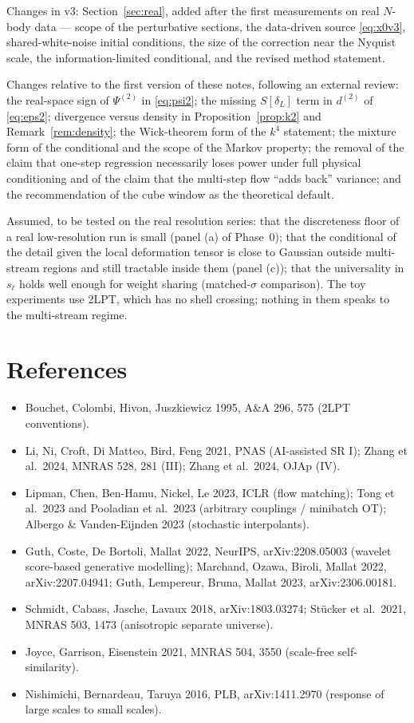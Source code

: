 \documentclass[11pt]{article}
\theoremstyle{definition}
\begin{document}
Changes in v3: Section~\ref{sec:real}, added after the first measurements on real $N$-body data --- scope of the perturbative sections, the data-driven source \eqref{eq:x0v3}, shared-white-noise initial conditions, the size of the correction near the Nyquist scale, the information-limited conditional, and the revised method statement.

Changes relative to the first version of these notes, following an external review: the real-space sign of $\Psi^{(2)}$ in \eqref{eq:psi2}; the missing $S[\delta_L]$ term in $d^{(2)}$ of \eqref{eq:eps2}; divergence versus density in Proposition~\ref{prop:k2} and Remark~\ref{rem:density}; the Wick-theorem form of the $k^4$ statement; the mixture form of the conditional and the scope of the Markov property; the removal of the claim that one-step regression necessarily loses power under full physical conditioning and of the claim that the multi-step flow ``adds back'' variance; and the recommendation of the cube window as the theoretical default.

Assumed, to be tested on the real resolution series: that the discreteness floor of a real low-resolution run is small (panel (a) of Phase~0); that the conditional of the detail given the local deformation tensor is close to Gaussian outside multi-stream regions and still tractable inside them (panel (c)); that the universality in $s_\ell$ holds well enough for weight sharing (matched-$\sigma$ comparison). The toy experiments use 2LPT, which has no shell crossing; nothing in them speaks to the multi-stream regime.

\section*{References}
\begin{itemize}
\item[] Bouchet, Colombi, Hivon, Juszkiewicz 1995, A\&A 296, 575 (2LPT conventions).
\item[] Li, Ni, Croft, Di Matteo, Bird, Feng 2021, PNAS (AI-assisted SR I); Zhang et al.\ 2024, MNRAS 528, 281 (III); Zhang et al.\ 2024, OJAp (IV).
\item[] Lipman, Chen, Ben-Hamu, Nickel, Le 2023, ICLR (flow matching); Tong et al.\ 2023 and Pooladian et al.\ 2023 (arbitrary couplings / minibatch OT); Albergo \& Vanden-Eijnden 2023 (stochastic interpolants).
\item[] Guth, Coste, De Bortoli, Mallat 2022, NeurIPS, arXiv:2208.05003 (wavelet score-based generative modelling); Marchand, Ozawa, Biroli, Mallat 2022, arXiv:2207.04941; Guth, Lempereur, Bruna, Mallat 2023, arXiv:2306.00181.
\item[] Schmidt, Cabass, Jasche, Lavaux 2018, arXiv:1803.03274; St\"ucker et al.\ 2021, MNRAS 503, 1473 (anisotropic separate universe).
\item[] Joyce, Garrison, Eisenstein 2021, MNRAS 504, 3550 (scale-free self-similarity).
\item[] Nishimichi, Bernardeau, Taruya 2016, PLB, arXiv:1411.2970 (response of large scales to small scales).
\end{itemize}
\end{document}
